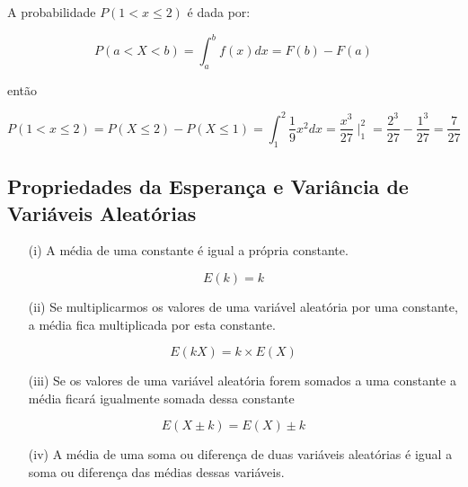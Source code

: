 A probabilidade $P(1 < x \leq 2)$ é dada por:

$$
P(a < X < b)=\int^{b}_{a}f(x)dx = F(b)-F(a)
$$

então

$$P(1 < x \leq 2) = P(X \leq 2) - P(X \leq 1) = \int^{2}_{1}\frac{1}{9}x^{2}dx = \frac{x^{3}}{27}\mid^{2}_{1}=
\frac{2^{3}}{27}-\frac{1^{3}}{27}=\frac{7}{27}$$



\subsection{Propriedades da Esperança e Variância de Variáveis Aleatórias}

\begin{enumerate}
    \item[{(i)}] A média de uma constante é igual a própria constante.
\end{enumerate}

\begin{equation}\label{}
E(k)=k
\end{equation}


\begin{enumerate}
    \item[{(ii)}] Se multiplicarmos os valores de uma variável aleatória
    por uma constante, a média fica multiplicada por esta
    constante.
\end{enumerate}


\begin{equation}\label{}
E(kX)=k \times E(X)
\end{equation}


\begin{enumerate}
    \item[{(iii)}] Se os valores de uma variável aleatória forem somados a
    uma constante a média ficará igualmente somada dessa constante
\end{enumerate}


\begin{equation}\label{}
E(X\pm k)=E(X)\pm k
\end{equation}


\begin{enumerate}
    \item[{(iv)}] A média de uma soma ou diferença de duas variáveis
    aleatórias é igual a soma ou diferença das médias dessas
    variáveis.
\end{enumerate}


